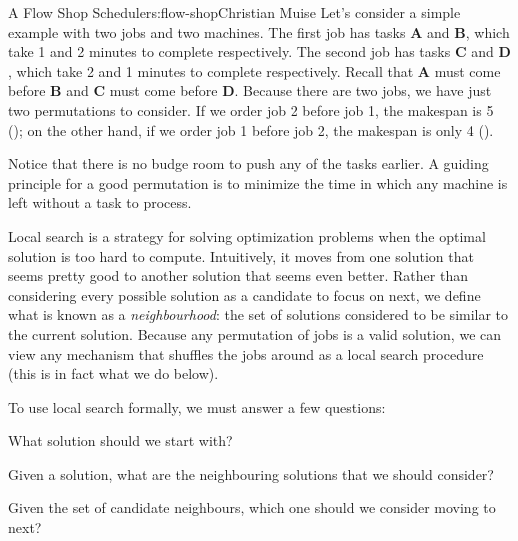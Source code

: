 \begin{aosachapter}{A Flow Shop Scheduler}{s:flow-shop}{Christian Muise}
Let's consider a simple example with two jobs and two machines. The
first job has tasks $\mathbf{A}$ and $\mathbf{B}$, which take 1 and 2
minutes to complete respectively. The second job has tasks $\mathbf{C}$
and $\mathbf{D}$, which take 2 and 1 minutes to complete respectively.
Recall that $\mathbf{A}$ must come before $\mathbf{B}$ and $\mathbf{C}$
must come before $\mathbf{D}$. Because there are two jobs, we have just
two permutations to consider. If we order job 2 before job 1, the
makespan is 5 (); on the other hand,
if we order job 1 before job 2, the makespan is only 4
().



Notice that there is no budge room to push any of the tasks earlier. A
guiding principle for a good permutation is to minimize the time in
which any machine is left without a task to process.

\label{local-search}

Local search is a strategy for solving optimization problems when the
optimal solution is too hard to compute. Intuitively, it moves from one
solution that seems pretty good to another solution that seems even
better. Rather than considering every possible solution as a candidate
to focus on next, we define what is known as a \emph{neighbourhood}: the
set of solutions considered to be similar to the current solution.
Because any permutation of jobs is a valid solution, we can view any
mechanism that shuffles the jobs around as a local search procedure
(this is in fact what we do below).

To use local search formally, we must answer a few questions:

\begin{aosaenumerate}
\def\labelenumi{\arabic{enumi}.}

\item
  What solution should we start with?
\item
  Given a solution, what are the neighbouring solutions that we should
  consider?
\item
  Given the set of candidate neighbours, which one should we consider
  moving to next?
\end{aosaenumerate}


\end{aosachapter}
